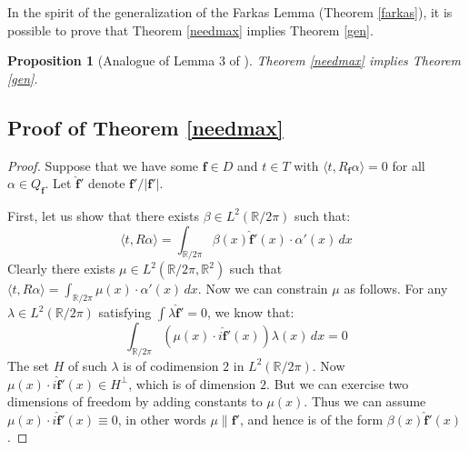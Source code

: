 \documentclass{amsart}
\newcommand{\R}			{\mathbb R}
\newcommand{\f}			{\mathbf f}
\newcommand{\Ltwo}		{L^2}
\newtheorem{proposition}[theorem]{Proposition}
\numberwithin{equation}{section}
\begin{document}
In the spirit of the generalization of the Farkas Lemma (Theorem 
\ref{farkas}), it is possible to prove that Theorem \ref{needmax} implies 
Theorem \ref{gen}.

\begin{proposition}[Analogue of Lemma 3 of {\cite[p. 216]{cdr}}]\label{impl}
Theorem \ref{needmax} implies Theorem \ref{gen}.
\end{proposition}

\subsection{Proof of Theorem \ref{needmax}}

\begin{proof}
Suppose that we have some $\f\in D$ and $t\in T$ 
with $\langle t,R_\f\alpha\rangle=0$ for all $\alpha\in Q_\f$.  
Let $\mathbf{\hat f}'$ denote $\f'/|\f'|$.

First, let us show that there exists 
$\beta\in\Ltwo(\R/2\pi)$ such that:
\begin{equation}
\langle t,R\alpha\rangle=\int_{\R/2\pi}\beta(x)\mathbf{\hat f}'(x)\cdot\alpha'(x)\,dx
\end{equation}
Clearly there exists $\mu\in\Ltwo(\R/2\pi,\R^2)$ 
such that 
$\langle t,R\alpha\rangle=\int_{\R/2\pi}\mu(x)\cdot\alpha'(x)\,dx$.  
Now we can constrain $\mu$ as follows.  For any 
$\lambda\in\Ltwo(\R/2\pi)$ satisfying 
$\int\lambda\mathbf{\hat f}'=0$, we know that:
\begin{equation}
\int_{\R/2\pi}\left(\mu(x)\cdot i\mathbf{\hat f}'(x)\right)\lambda(x)\,dx=0
\end{equation}
The set $H$ of such $\lambda$ is of codimension $2$ in 
$\Ltwo(\R/2\pi)$.  Now 
$\mu(x)\cdot i\mathbf{\hat f}'(x)\in H^\perp$, 
which is of dimension $2$.  But we can exercise 
two dimensions of freedom by 
adding constants to $\mu(x)$.  Thus we can assume 
$\mu(x)\cdot i\mathbf{\hat f}'(x)\equiv 0$, 
in other words $\mu\parallel\f'$, and hence is 
of the form $\beta(x)\mathbf{\hat f}'(x)$.


\end{proof}
\end{document}
